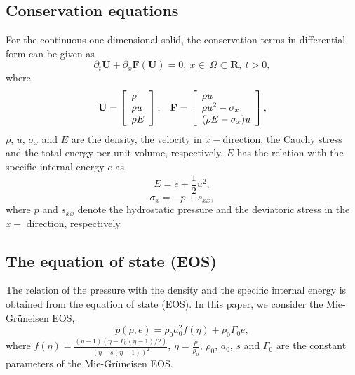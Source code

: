 \documentclass[review]{elsarticle}
\begin{document}
\subsection{Conservation equations}
For  the  continuous one-dimensional solid, the conservation terms  in differential form can be  given as
\begin{equation}\label{eq:conser}
\partial_t \mathbf{{U}} + \partial _x \bm{F}(\mathbf{{U}}) = 0, \   x \in \   \Omega \subset \mathbf{R}, \  t>0,
\end{equation}
where
\begin{equation}
  \mathbf{U} = \left[ \begin{array}{l}
      \rho \\
      \rho u \\
      \rho  E \\
    \end{array}
  \right],
  \hspace{0.3cm}
  \mathbf{F} = \left[ \begin{array}{l}
      \rho u \\
      \rho u^2 -\sigma_x\\
      (\rho E -\sigma_x)u\\
  \end{array} \right],
\end{equation}
$\rho$, $u$, $\sigma_x$ and $E$ are  the density, the  velocity in $x-$direction,  the Cauchy stress and  the total energy per unit volume, respectively, $E$ has the relation with  the specific internal energy $e$ as
\begin{equation}
  E = e+\frac{1}{2}u^2,
\end{equation}
\begin{equation}
  \sigma_x = -p +s_{xx},
\end{equation}
where $p$ and $s_{xx}$ denote the  hydrostatic pressure and the  deviatoric stress in the $x-$ direction, respectively.

\subsection{The equation of state (EOS)}

The relation of the pressure with  the density and the specific internal energy is obtained from the equation of state (EOS). In this paper, we consider the Mie-Gr\"uneisen EOS,
\begin{equation}\label{eq:mie}
  p(\rho,e) = \rho_0 a_0^2f(\eta)+ \rho_0 \Gamma_0 e,
\end{equation}
where $f(\eta) = \frac{(\eta-1)(\eta-\Gamma_0(\eta-1)/2)}{(\eta-s(\eta-1))^2}$, $\eta = \frac{\rho}{\rho_0}$, $\rho_0$, $a_0$, $s$ and $\Gamma_0$ are the constant parameters of the Mie-Gr\"uneisen EOS.
\end{document}
